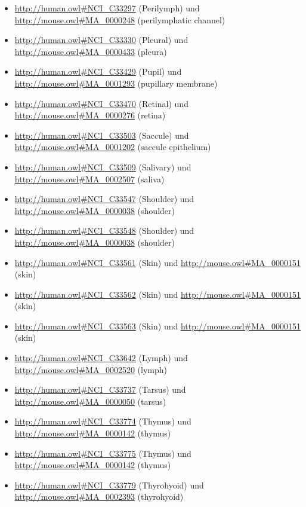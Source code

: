 \begin{itemize}
	\item \url{http://human.owl#NCI_C33297} (Perilymph) und \url{http://mouse.owl#MA_0000248} (perilymphatic channel)
	\item \url{http://human.owl#NCI_C33330} (Pleural\textunderscoreMesothelial\textunderscoreCell) und \url{http://mouse.owl#MA_0000433} (pleura)
	\item \url{http://human.owl#NCI_C33429} (Pupil) und \url{http://mouse.owl#MA_0001293} (pupillary membrane)
	\item \url{http://human.owl#NCI_C33470} (Retinal\textunderscorePigment\textunderscoreEpithelium) und \url{http://mouse.owl#MA_0000276} (retina)
	\item \url{http://human.owl#NCI_C33503} (Saccule) und \url{http://mouse.owl#MA_0001202} (saccule epithelium)
	\item \url{http://human.owl#NCI_C33509} (Salivary\textunderscoreGlund\textunderscoreTissue) und \url{http://mouse.owl#MA_0002507} (saliva)
	\item \url{http://human.owl#NCI_C33547} (Shoulder\textunderscoreGirdle) und \url{http://mouse.owl#MA_0000038} (shoulder)
	\item \url{http://human.owl#NCI_C33548} (Shoulder\textunderscoreJoint) und \url{http://mouse.owl#MA_0000038} (shoulder)
	\item \url{http://human.owl#NCI_C33561} (Skin\textunderscoreof\textunderscorethe\textunderscoreFace) und \url{http://mouse.owl#MA_0000151} (skin)
	\item \url{http://human.owl#NCI_C33562} (Skin\textunderscoreSquamous\textunderscoreCell) und \url{http://mouse.owl#MA_0000151} (skin)
	\item \url{http://human.owl#NCI_C33563} (Skin\textunderscoreTissue) und \url{http://mouse.owl#MA_0000151} (skin)
	\item \url{http://human.owl#NCI_C33642} (Lymph\textunderscoreNode\textunderscoreSubcapsular\textunderscoreSinus) und \url{http://mouse.owl#MA_0002520} (lymph)
	\item \url{http://human.owl#NCI_C33737} (Tarsus\textunderscoreBone) und \url{http://mouse.owl#MA_0000050} (tarsus)
	\item \url{http://human.owl#NCI_C33774} (Thymus\textunderscoreCortex) und \url{http://mouse.owl#MA_0000142} (thymus)
	\item \url{http://human.owl#NCI_C33775} (Thymus\textunderscoreMedulla) und \url{http://mouse.owl#MA_0000142} (thymus)
	\item \url{http://human.owl#NCI_C33779} (Thyrohyoid\textunderscoreLigament) und \url{http://mouse.owl#MA_0002393} (thyrohyoid)

\end{itemize}
